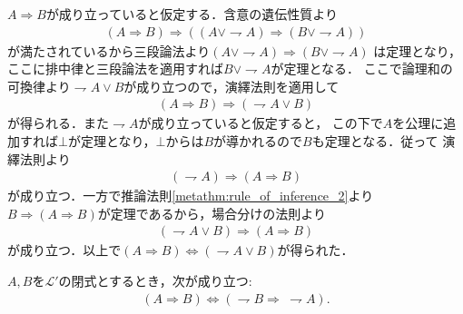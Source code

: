 	\begin{prf}
		$A \Longrightarrow B$が成り立っていると仮定する．含意の遺伝性質より
		\begin{align}
			(A \Longrightarrow B) \Longrightarrow 
			((A \vee \rightharpoondown A) \Longrightarrow (B \vee \rightharpoondown A))
		\end{align}
		が満たされているから三段論法より$(A \vee \rightharpoondown A) \Longrightarrow (B \vee \rightharpoondown A)$
		は定理となり，ここに排中律と三段論法を適用すれば$B \vee \rightharpoondown A$が定理となる．
		ここで論理和の可換律より$\rightharpoondown A \vee B$が成り立つので，演繹法則を適用して
		\begin{align}
			(A \Longrightarrow B) \Longrightarrow (\rightharpoondown A \vee B)
		\end{align}
		が得られる．また$\rightharpoondown A$が成り立っていると仮定すると，
		この下で$A$を公理に追加すれば$\bot$が定理となり，$\bot$からは$B$が導かれるので$B$も定理となる．従って
		演繹法則より
		\begin{align}
			(\rightharpoondown A) \Longrightarrow (A \Longrightarrow B)
		\end{align}
		が成り立つ．一方で推論法則\ref{metathm:rule_of_inference_2}より
		$B \Longrightarrow (A \Longrightarrow B)$が定理であるから，場合分けの法則より
		\begin{align}
			(\rightharpoondown A \vee B) \Longrightarrow (A \Longrightarrow B)
		\end{align}
		が成り立つ．以上で$(A \Longrightarrow B) \Longleftrightarrow (\rightharpoondown A \vee B)$が得られた．
		\QED
	\end{prf}
	
	
	\begin{screen}
		\begin{metathm}[対偶命題は同値]
			$A,B$を$\mathcal{L}'$の閉式とするとき，次が成り立つ:
			\begin{align}
				(A \Longrightarrow B) \Longleftrightarrow (\rightharpoondown B \Longrightarrow\ \rightharpoondown A).
			\end{align}
		\end{metathm}
	\end{screen}
	
